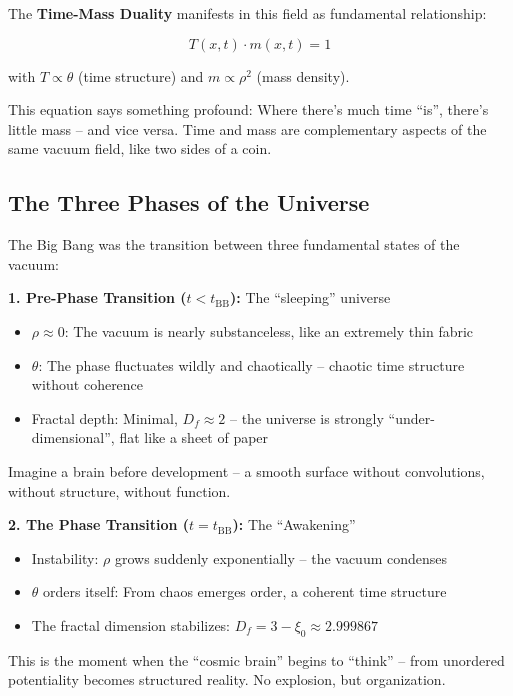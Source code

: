 \documentclass[12pt,a4paper]{article}
\begin{document}
The \textbf{Time-Mass Duality} manifests in this field as fundamental relationship:

\begin{equation}
T(x,t) \cdot m(x,t) = 1
\end{equation}

with $T \propto \theta$ (time structure) and $m \propto \rho^2$ (mass density).

This equation says something profound: Where there's much time ``is'', there's little mass -- and vice versa. Time and mass are complementary aspects of the same vacuum field, like two sides of a coin.

\subsection{The Three Phases of the Universe}

The Big Bang was the transition between three fundamental states of the vacuum:

\textbf{1. Pre-Phase Transition ($t < t_{\text{BB}}$):} The ``sleeping'' universe

\begin{itemize}[leftmargin=*]
\item $\rho \approx 0$: The vacuum is nearly substanceless, like an extremely thin fabric
\item $\theta$: The phase fluctuates wildly and chaotically -- chaotic time structure without coherence
\item Fractal depth: Minimal, $D_f \approx 2$ -- the universe is strongly ``under-dimensional'', flat like a sheet of paper
\end{itemize}

Imagine a brain before development -- a smooth surface without convolutions, without structure, without function.

\textbf{2. The Phase Transition ($t = t_{\text{BB}}$):} The ``Awakening''

\begin{itemize}[leftmargin=*]
\item Instability: $\rho$ grows suddenly exponentially -- the vacuum condenses
\item $\theta$ orders itself: From chaos emerges order, a coherent time structure
\item The fractal dimension stabilizes: $D_f = 3 - \xi_0 \approx 2.999867$
\end{itemize}

This is the moment when the ``cosmic brain'' begins to ``think'' -- from unordered potentiality becomes structured reality. No explosion, but organization.
\end{document}
